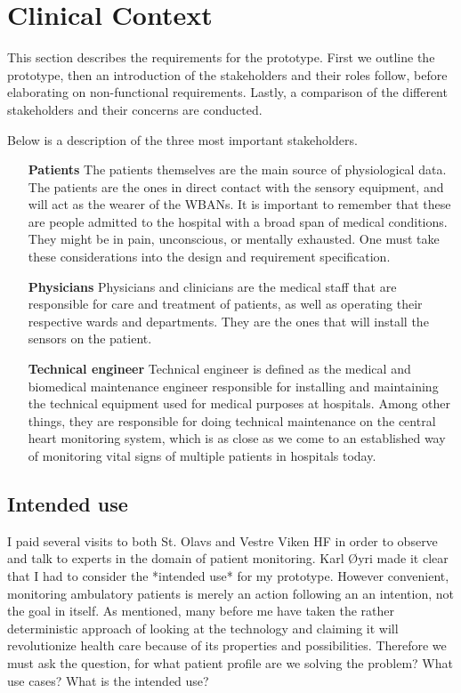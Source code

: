 \section{Clinical Context} %
\label{sec:clinical_context}

This section describes the requirements for the prototype. First we outline the prototype, then an introduction of the stakeholders and their roles follow, before elaborating on non-functional requirements. Lastly, a comparison of the different stakeholders and their concerns are conducted. 

Below is a description of the three most important stakeholders.

\begin{itemize}

  \item[\textbf{Patients}] The patients themselves are the main source of physiological data. The patients are the ones in direct contact with the sensory equipment, and will act as the wearer of the  WBANs. It is important to remember that these are people admitted to the hospital with a broad span of medical conditions. They might be in pain, unconscious, or mentally exhausted. One must take these considerations into the design and requirement specification.

  \item[\textbf{Physicians}] Physicians and clinicians are the medical staff that are responsible for care and treatment of patients, as well as operating their respective wards and departments. They are the ones that will install the sensors on the patient.

  \item[\textbf{Technical engineer}] Technical engineer is defined as the medical and biomedical maintenance engineer responsible for installing and maintaining the technical equipment used for medical purposes at hospitals. Among other things, they are responsible for doing technical maintenance  on the central heart monitoring system, which is as close as we come to an established way of monitoring vital signs of multiple patients in hospitals today.

\end{itemize}


\subsection{Intended use} %
\label{sub:intended_use}

I paid several visits to both St. Olavs and Vestre Viken HF in order to observe and talk to experts in the domain of patient monitoring. Karl Øyri made it clear that I had to consider the *intended use* for my prototype. However convenient, monitoring ambulatory patients is merely an action following an an intention, not the goal in itself. As mentioned, many before me have taken the rather deterministic approach of looking at the technology and claiming it will revolutionize health care because of its properties and possibilities. Therefore we must ask the question, for what patient profile are we solving the problem? What use cases? What is the intended use?

